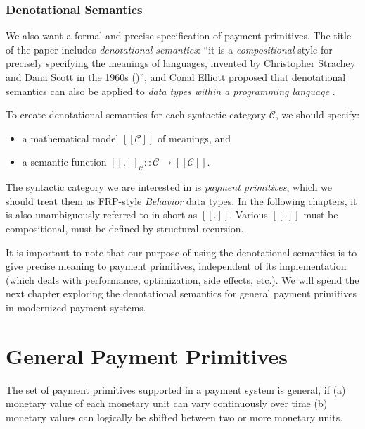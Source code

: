 \subsection{Denotational Semantics}

We also want a formal and precise specification of payment primitives. The title of the paper
includes \textit{denotational semantics}: ``it is a \textit{compositional} style for precisely
specifying the meanings of languages, invented by Christopher Strachey and Dana Scott in the 1960s
(\cite{scott1971toward})'', and Conal Elliott proposed that denotational semantics can also be
applied to \textit{data types within a programming language}
.

To create denotational semantics for each syntactic category $\mathcal{C}$, we should specify:

\begin{itemize}
\item a mathematical model $[\![\mathcal{C}]\!]$ of meanings, and
\item a semantic function $[\![.]\!]_{\mathcal{C}} :: \mathcal{C} \rightarrow [\![\mathcal{C}]\!]$.
\end{itemize}

The syntactic category we are interested in is \textit{payment primitives}, which we should treat
them as FRP-style \textit{Behavior} data types. In the following chapters, it is also unambiguously
referred to in short as $[\![.]\!]$. Various $[\![.]\!]$ must be compositional, \ie must be defined
by structural recursion.

It is important to note that our purpose of using the denotational semantics is to give precise
meaning to payment primitives, independent of its implementation (which deals with performance,
optimization, side effects, etc.). We will spend the next chapter exploring the denotational
semantics for general payment primitives in modernized payment systems.

\chapter{General Payment Primitives}

The set of payment primitives supported in a payment system is general, if (a) monetary value of
each monetary unit can vary continuously over time (b) monetary values can logically be shifted
between two or more monetary units.

